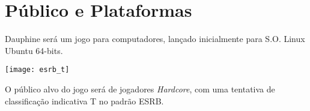\AddToShipoutPicture{\BackgroundPic}

\section*{Público e Plataformas}

Dauphine será um jogo para computadores, lançado inicialmente para S.O. Linux Ubuntu 64-bits.


\begin{minipage}[h]{\textwidth}
	\begin{minipage}[h]{0.25\textwidth}
		\begin{center}
			\texttt{[image: esrb\_t]}
		\end{center}
	\end{minipage}
	\begin{minipage}[h]{0.75\textwidth}
		O público alvo do jogo será de jogadores \emph{Hardcore}, com uma tentativa de classificação indicativa T no padrão ESRB.	
	\end{minipage}
\end{minipage}

